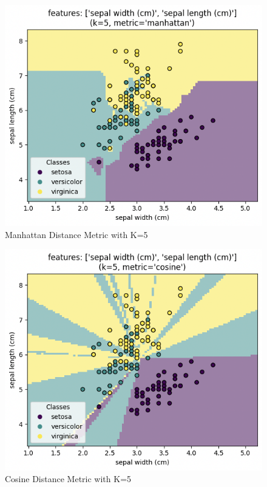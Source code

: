 \documentclass[journal]{IEEEtran}
\begin{document}
\begin{figure}[h!]
\includegraphics[scale=0.4]{manhattan_k5.png}
\centering
\caption{Manhattan Distance Metric with K=5}
\label{fig:mank5}
\end{figure}

\begin{figure}[h!]
\includegraphics[scale=0.4]{cosine_k5.png}
\centering
\caption{Cosine Distance Metric with K=5}
\label{fig:cosk5}
\end{figure}
\end{document}
